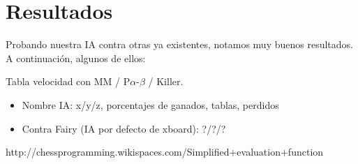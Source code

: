 \documentclass{article}
\begin{document}
\section{Resultados}
Probando nuestra IA contra otras ya existentes, notamos muy buenos resultados. A continuación, algunos de ellos:

Tabla velocidad con MM / P$\alpha$-$\beta$ / Killer.

\begin{itemize}
\item Nombre IA: \hfill x/y/z, porcentajes de ganados, tablas, perdidos
\item Contra Fairy (IA por defecto de xboard): \hfill ?/?/?
\end{itemize}


\begin{thebibliography}{9}

  http://chessprogramming.wikispaces.com/Simplified+evaluation+function

\end{thebibliography}
\end{document}
